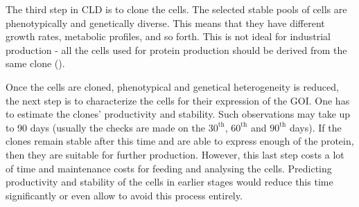 The third step in CLD is to clone the cells. The selected stable pools of cells are phenotypically and genetically diverse. This means that they have different growth rates, metabolic profiles, and so forth. This is not ideal for industrial production - all the cells used for protein production should be derived from the same clone (\cite{ema_2020}). 

Once the cells are cloned, phenotypical and genetical heterogeneity is reduced, the next step is to characterize the cells for their expression of the GOI. One has to estimate the clones' productivity and stability. Such observations may take up to 90 days (usually the checks are made on the $30^{\text{th}}$, $60^{\text{th}}$ and $90^{\text{th}}$ days). If the clones remain stable after this time and are able to express enough of the protein, then they are suitable for further production. However, this last step costs a lot of time and maintenance costs for feeding and analysing the cells. Predicting productivity and stability of the cells in earlier stages would reduce this time significantly or even allow to avoid this process entirely.